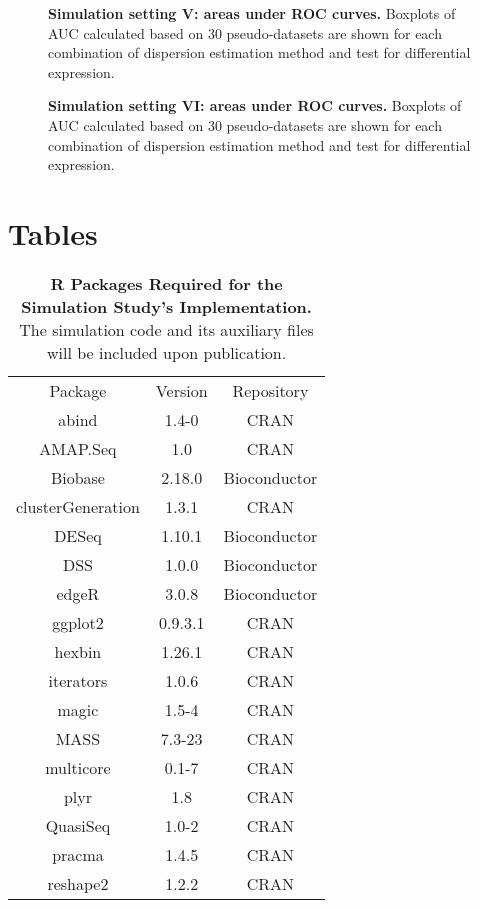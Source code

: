 \documentclass[10pt]{article}
\begin{document}
\begin{figure}[!ht] %
   \centering
   \caption{{\bf Simulation setting V: areas under ROC curves.} Boxplots of AUC calculated based on 30 pseudo-datasets are shown for each combination of dispersion estimation method and test for differential expression.} %
   \label{fig:auc5}
\end{figure}

\begin{figure}[!ht] %
   \centering
   \caption{{\bf Simulation setting VI: areas under ROC curves.} Boxplots of AUC calculated based on 30 pseudo-datasets are shown for each combination of dispersion estimation method and test for differential expression.} %
   \label{fig:auc6}
\end{figure}


\clearpage

\section*{Tables}

\begin{table}[!ht] %
   \centering
   \caption{{\bf R Packages Required for the Simulation Study's Implementation.} The simulation code and its auxiliary files will be included upon publication.}
\begin{tabular}{|c|c|c|}
Package & Version & Repository \\
  abind & 1.4-0 &CRAN\\
  AMAP.Seq & 1.0 &CRAN\\
  Biobase & 2.18.0 &Bioconductor\\
  clusterGeneration & 1.3.1 &CRAN\\
  DESeq & 1.10.1 &Bioconductor\\
  DSS & 1.0.0 &Bioconductor\\
  edgeR & 3.0.8 &Bioconductor\\
  ggplot2 & 0.9.3.1 &CRAN\\
  hexbin & 1.26.1 &CRAN\\
  iterators & 1.0.6 &CRAN\\
  magic & 1.5-4 &CRAN\\
  MASS & 7.3-23 &CRAN\\
  multicore & 0.1-7 &CRAN\\
  plyr & 1.8 &CRAN\\
  QuasiSeq & 1.0-2 &CRAN\\
  pracma & 1.4.5 &CRAN\\
  reshape2 & 1.2.2 &CRAN\\
\end{tabular}
\label{tab:software}
\end{table}
\end{document}
